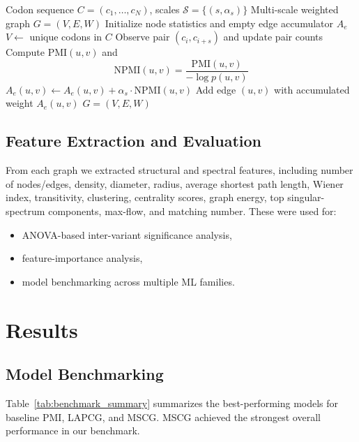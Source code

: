 \documentclass[conference]{IEEEtran}
\begin{document}
\begin{algorithm}[t]
\caption{MSCG Graph Construction}
\label{alg:mscg}
\begin{algorithmic}[1]
\REQUIRE Codon sequence $C=(c_1,\dots,c_N)$, scales $\mathcal{S}=\{(s,\alpha_s)\}$
\ENSURE Multi-scale weighted graph $G=(V,E,W)$
\STATE Initialize node statistics and empty edge accumulator $A_e$
\STATE $V \leftarrow$ unique codons in $C$
        \STATE Observe pair $(c_i, c_{i+s})$ and update pair counts
    \ENDFOR
        \STATE Compute $\mathrm{PMI}(u,v)$ and
        \[
        \mathrm{NPMI}(u,v)=\frac{\mathrm{PMI}(u,v)}{-\log p(u,v)}
        \]
            \STATE $A_e(u,v)\leftarrow A_e(u,v)+\alpha_s \cdot \mathrm{NPMI}(u,v)$
        \ENDIF
    \ENDFOR
\ENDFOR
{}
    \STATE Add edge $(u,v)$ with accumulated weight $A_e(u,v)$
\ENDFOR
\RETURN $G=(V,E,W)$
\end{algorithmic}
\end{algorithm}

\subsection{Feature Extraction and Evaluation}
From each graph we extracted structural and spectral features, including number of nodes/edges, density, diameter, radius, average shortest path length, Wiener index, transitivity, clustering, centrality scores, graph energy, top singular-spectrum components, max-flow, and matching number. These were used for:
\begin{itemize}
    \item ANOVA-based inter-variant significance analysis,
    \item feature-importance analysis,
    \item model benchmarking across multiple ML families.
\end{itemize}

\section{Results}
\label{sec:results}

\subsection{Model Benchmarking}
Table~\ref{tab:benchmark_summary} summarizes the best-performing models for baseline PMI, LAPCG, and MSCG. MSCG achieved the strongest overall performance in our benchmark.
\end{document}
